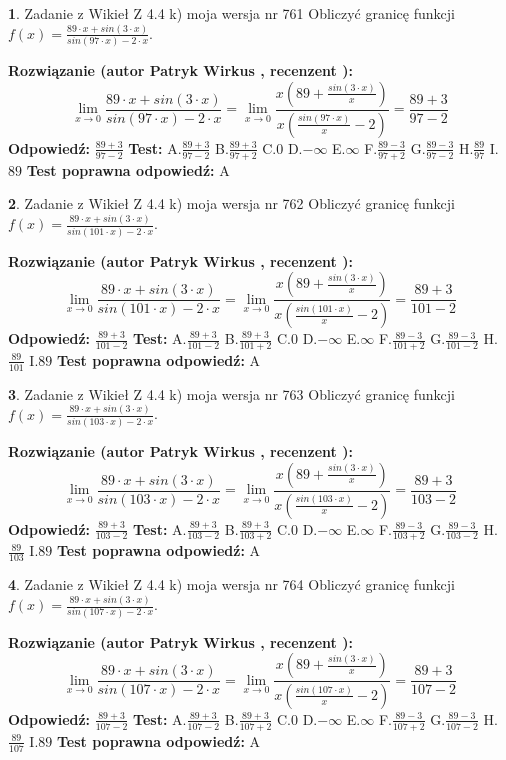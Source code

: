\documentclass[12pt, a4paper]{article}
\theoremstyle{definition} %
\newtheorem{zad}{}
\newcommand{\zadStart}[1]{\begin{zad}#1\newline}
\newcommand{\zadStop}{\end{zad}}
\newcommand{\rozwStart}[2]{\noindent \textbf{Rozwiązanie (autor #1 , recenzent #2): }\newline}
\newcommand{\rozwStop}{\newline}
\newcommand{\odpStart}{\noindent \textbf{Odpowiedź:}\newline}
\newcommand{\odpStop}{\newline}
\newcommand{\testStart}{\noindent \textbf{Test:}\newline}
\newcommand{\testStop}{\newline}
\newcommand{\kluczStart}{\noindent \textbf{Test poprawna odpowiedź:}\newline}
\newcommand{\kluczStop}{\newline}
\begin{document}
\zadStart{Zadanie z Wikieł Z 4.4 k) moja wersja nr 761}
Obliczyć granicę funkcji $f(x)=\frac{89\cdot x +sin(3\cdot x)}{sin(97\cdot x) -2\cdot x}$.
\zadStop
\rozwStart{Patryk Wirkus}{}
$$\lim\limits_{x\to 0}\frac{89\cdot x +sin(3\cdot x)}{sin(97\cdot x) -2\cdot x}
=\lim\limits_{x\to 0}\frac{x(89+\frac{sin(3\cdot x)}{x})}{x(\frac{sin(97\cdot x)}{x}-2)}
=\frac{89+3}{97-2}$$
\rozwStop
\odpStart
$\frac{89+3}{97-2}$
\odpStop
\testStart
A.$\frac{89+3}{97-2}$
B.$\frac{89+3}{97+2}$
C.$0$
D.$-\infty$
E.$\infty$
F.$\frac{89-3}{97+2}$
G.$\frac{89-3}{97-2}$
H.$\frac{89}{97}$
I.$89$
\testStop
\kluczStart
A
\kluczStop



\zadStart{Zadanie z Wikieł Z 4.4 k) moja wersja nr 762}
Obliczyć granicę funkcji $f(x)=\frac{89\cdot x +sin(3\cdot x)}{sin(101\cdot x) -2\cdot x}$.
\zadStop
\rozwStart{Patryk Wirkus}{}
$$\lim\limits_{x\to 0}\frac{89\cdot x +sin(3\cdot x)}{sin(101\cdot x) -2\cdot x}
=\lim\limits_{x\to 0}\frac{x(89+\frac{sin(3\cdot x)}{x})}{x(\frac{sin(101\cdot x)}{x}-2)}
=\frac{89+3}{101-2}$$
\rozwStop
\odpStart
$\frac{89+3}{101-2}$
\odpStop
\testStart
A.$\frac{89+3}{101-2}$
B.$\frac{89+3}{101+2}$
C.$0$
D.$-\infty$
E.$\infty$
F.$\frac{89-3}{101+2}$
G.$\frac{89-3}{101-2}$
H.$\frac{89}{101}$
I.$89$
\testStop
\kluczStart
A
\kluczStop



\zadStart{Zadanie z Wikieł Z 4.4 k) moja wersja nr 763}
Obliczyć granicę funkcji $f(x)=\frac{89\cdot x +sin(3\cdot x)}{sin(103\cdot x) -2\cdot x}$.
\zadStop
\rozwStart{Patryk Wirkus}{}
$$\lim\limits_{x\to 0}\frac{89\cdot x +sin(3\cdot x)}{sin(103\cdot x) -2\cdot x}
=\lim\limits_{x\to 0}\frac{x(89+\frac{sin(3\cdot x)}{x})}{x(\frac{sin(103\cdot x)}{x}-2)}
=\frac{89+3}{103-2}$$
\rozwStop
\odpStart
$\frac{89+3}{103-2}$
\odpStop
\testStart
A.$\frac{89+3}{103-2}$
B.$\frac{89+3}{103+2}$
C.$0$
D.$-\infty$
E.$\infty$
F.$\frac{89-3}{103+2}$
G.$\frac{89-3}{103-2}$
H.$\frac{89}{103}$
I.$89$
\testStop
\kluczStart
A
\kluczStop



\zadStart{Zadanie z Wikieł Z 4.4 k) moja wersja nr 764}
Obliczyć granicę funkcji $f(x)=\frac{89\cdot x +sin(3\cdot x)}{sin(107\cdot x) -2\cdot x}$.
\zadStop
\rozwStart{Patryk Wirkus}{}
$$\lim\limits_{x\to 0}\frac{89\cdot x +sin(3\cdot x)}{sin(107\cdot x) -2\cdot x}
=\lim\limits_{x\to 0}\frac{x(89+\frac{sin(3\cdot x)}{x})}{x(\frac{sin(107\cdot x)}{x}-2)}
=\frac{89+3}{107-2}$$
\rozwStop
\odpStart
$\frac{89+3}{107-2}$
\odpStop
\testStart
A.$\frac{89+3}{107-2}$
B.$\frac{89+3}{107+2}$
C.$0$
D.$-\infty$
E.$\infty$
F.$\frac{89-3}{107+2}$
G.$\frac{89-3}{107-2}$
H.$\frac{89}{107}$
I.$89$
\testStop
\kluczStart
A
\kluczStop
\end{document}
